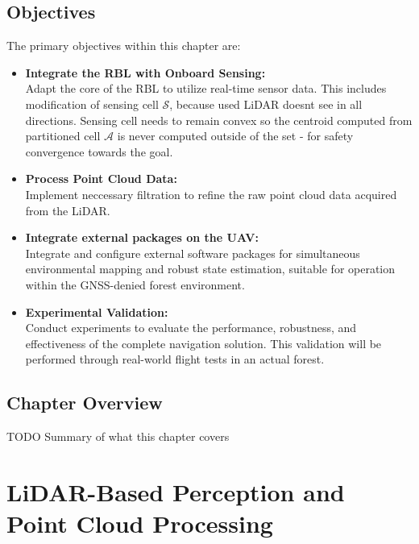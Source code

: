         \subsection{Objectives}
            The primary objectives within this chapter are: 
            \begin{itemize}
                \item \textbf{Integrate the \ac{RBL} with Onboard Sensing: } \\
                    Adapt the core of the \ac{RBL} to utilize real-time sensor data. 
                    This includes modification of sensing cell $\mathcal{S}$, because used \ac{LiDAR} doesnt see in all directions. 
                    Sensing cell needs to remain convex so the centroid computed from partitioned cell $\mathcal{A}$ is never computed outside of the set - for safety convergence towards the goal.
                \item \textbf{Process Point Cloud Data: } \\
                    Implement neccessary filtration to refine the raw point cloud data acquired from the \ac{LiDAR}.
                \item \textbf{Integrate external packages on the \ac{UAV}: } \\
                    Integrate and configure external software packages for simultaneous environmental mapping and robust state estimation, suitable for operation within the \ac{GNSS}-denied forest environment.
                \item \textbf{Experimental Validation: } \\
                    Conduct experiments to evaluate the performance, robustness, and effectiveness of the complete navigation solution. 
                    This validation will be performed through real-world flight tests in an actual forest.
            \end{itemize}

        \subsection{Chapter Overview}
            TODO Summary of what this chapter covers

    \section{LiDAR-Based Perception and Point Cloud Processing}
